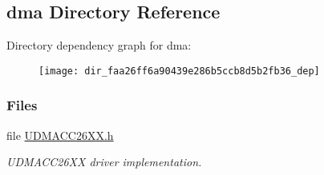 \subsection{dma Directory Reference}
\label{dir_faa26ff6a90439e286b5ccb8d5b2fb36}
Directory dependency graph for dma\+:
\nopagebreak
\begin{figure}[H]
\begin{center}
\leavevmode
\texttt{[image: dir\_faa26ff6a90439e286b5ccb8d5b2fb36\_dep]}
\end{center}
\end{figure}
\subsubsection*{Files}
\begin{DoxyCompactItemize}
\item 
file \hyperlink{_u_d_m_a_c_c26_x_x_8h}{U\+D\+M\+A\+C\+C26\+X\+X.\+h}
\begin{DoxyCompactList}\small\item\em U\+D\+M\+A\+C\+C26\+X\+X driver implementation. \end{DoxyCompactList}\end{DoxyCompactItemize}
